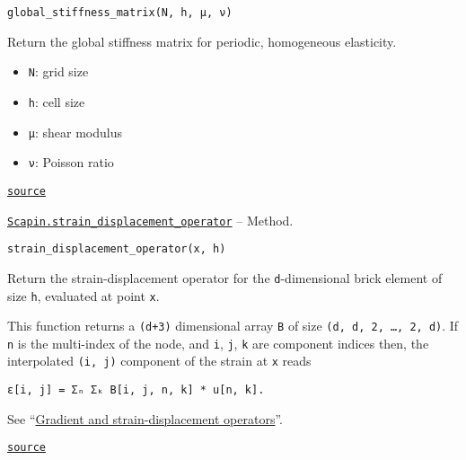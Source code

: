 \documentclass[oneside]{memoir}
\begin{document}
\begin{adjustwidth}{2em}{0pt}


\begin{verbatim}
global_stiffness_matrix(N, h, μ, ν)
\end{verbatim}

Return the global stiffness matrix for periodic, homogeneous elasticity.

\begin{itemize}
\item \texttt{N}: grid size


\item \texttt{h}: cell size


\item \texttt{μ}: shear modulus


\item \texttt{ν}: Poisson ratio

\end{itemize}


\href{https://github.com/sbrisard/Scapin.jl/blob/ea3f90c60e90cdf214e41b1314a8ee608e0b8d10/src/bri17.jl#L295-L305}{\texttt{source}}


\end{adjustwidth}
\hypertarget{3699099644231930551}{} 
\hyperlink{3699099644231930551}{\texttt{Scapin.strain\_displacement\_operator}}  -- {Method.}

\begin{adjustwidth}{2em}{0pt}


\begin{verbatim}
strain_displacement_operator(x, h)
\end{verbatim}

Return the strain-displacement operator for the \texttt{d}-dimensional brick element of size \texttt{h}, evaluated at point \texttt{x}.

This function returns a \texttt{(d+3)} dimensional array \texttt{B} of size \texttt{(d, d, 2, …, 2, d)}. If \texttt{n} is the multi-index of the node, and \texttt{i}, \texttt{j}, \texttt{k} are component indices then, the interpolated \texttt{(i, j)} component of the strain at \texttt{x} reads


\begin{lstlisting}
ε[i, j] = Σₙ Σₖ B[i, j, n, k] * u[n, k].
\end{lstlisting}

See “\hyperlink{5967194672630999247}{Gradient and strain-displacement operators}”.



\href{https://github.com/sbrisard/Scapin.jl/blob/ea3f90c60e90cdf214e41b1314a8ee608e0b8d10/src/bri17.jl#L201-L216}{\texttt{source}}


\end{adjustwidth}
\end{document}
